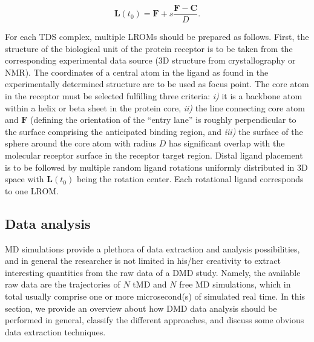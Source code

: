 \begin{equation}
\bm{L}(t_0) = \bm{F} + s \frac{\bm{F}-\bm{C}}{D}.
\end{equation}

For each TDS complex, multiple LROMs should be prepared as follows. First, the
structure of the biological unit of the protein receptor is to be taken from the
corresponding experimental data source (3D structure from crystallography or
NMR). The coordinates of a central atom in the ligand as found in the
experimentally determined structure are to be used as focus point. The core atom
in the receptor must be selected fulfilling three criteria: \textit{i)} it is a
backbone atom within a helix or beta sheet in the protein core, \textit{ii)} the
line connecting core atom and $\bm{F}$ (defining the orientation of the ``entry
lane'' is roughly perpendicular to the surface comprising the anticipated
binding region, and \textit{iii)} the surface of the sphere around the core atom
with radius $D$ has significant overlap with the molecular receptor surface in
the receptor target region. Distal ligand placement is to be followed by
multiple random ligand rotations uniformly distributed in 3D space with
$\bm{L}(t_0)$ being the rotation center. Each rotational ligand corresponds to
one LROM.

\subsection{Data analysis}

MD simulations provide a plethora of data extraction and analysis possibilities,
and in general the researcher is not limited in his/her creativity to extract
interesting quantities from the raw data of a DMD study. Namely, the available
raw data are the trajectories of $N$ tMD and $N$ free MD simulations, which in
total usually comprise one or more microsecond(s) of simulated real time. In
this section, we provide an overview about how DMD data analysis should be
performed in general, classify the different approaches, and discuss some
obvious data extraction techniques.

